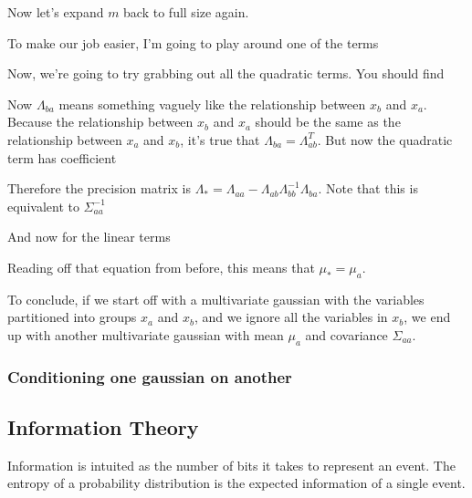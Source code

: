 \documentclass[12pt]{article}
\begin{document}
Now let's expand $m$ back to full size again.


To make our job easier, I'm going to play around one of the terms

Now, we're going to try grabbing out all the quadratic terms. You should find

Now $\Lambda_{ba}$ means something vaguely like the relationship between $x_b$ and $x_a$. Because the relationship between $x_b$ and $x_a$ should be the same as the relationship between $x_a$ and $x_b$, it's true that $\Lambda_{ba} = \Lambda_{ab}^T$. But now the quadratic term has coefficient

Therefore the precision matrix is $\Lambda_* = \Lambda_{aa} - \Lambda_{ab} \Lambda_{bb}^{-1} \Lambda_{ba}$. Note that this is equivalent to $\Sigma_{aa}^{-1}$

And now for the linear terms

Reading off that equation from before, this means that $\mu_* = \mu_a$.

To conclude, if we start off with a multivariate gaussian with the variables partitioned into groups $x_a$ and $x_b$, and we ignore all the variables in $x_b$, we end up with another multivariate gaussian with mean $\mu_a$ and covariance $\Sigma_{aa}$.

\subsubsection{Conditioning one gaussian on another}

\subsection{Information Theory}

Information is intuited as the number of bits it takes to represent an event. The entropy of a probability distribution is the expected information of a single event. 
\end{document}
